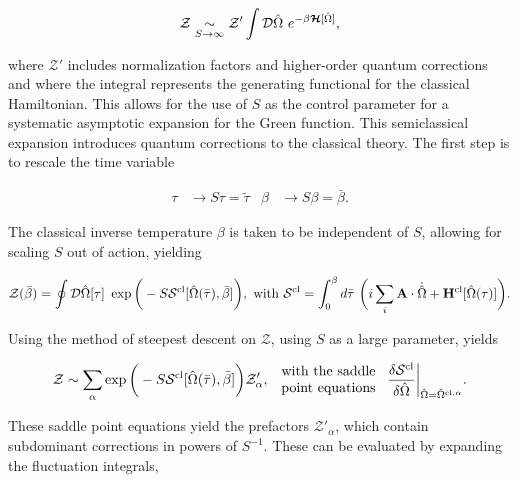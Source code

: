\begin{equation}
    \mathcal{Z} \underset{S \rightarrow \infty}{\sim} \mathcal{Z}' \int \mathcal{D}\hat{\Omega} \textnormal{ } e^{-\beta \bm{\mathcal{H}}[\hat{\Omega}]},
    \label{spin_wave_theoretic_wave_partition_func}
\end{equation}

where $\mathcal{Z}'$ includes normalization factors and higher-order quantum corrections and where the integral represents the generating functional for the classical Hamiltonian. This allows for the use of $S$ as the control parameter for a systematic asymptotic expansion for the Green function. This semiclassical expansion introduces quantum corrections to the classical theory. The first step is to rescale the time variable 

\begin{align}
    \tau &\rightarrow S\tau = \tilde{\tau} & \beta & \rightarrow S\beta = \bar{\beta}.
\end{align}

The classical inverse temperature $\beta$ is taken to be independent of $S$, allowing for scaling $S$ out of action, yielding 

\begin{equation}
    \mathcal{Z}(\bar{\beta}) = \oint \mathcal{D}\hat{\Omega}[\tau] \textnormal{ } \exp \bigg( - S \mathcal{S}^{\textnormal{cl}}[\hat{\Omega}(\bar{\tau}), \bar{\beta}]\bigg), \textnormal{ with } \mathcal{S}^{\textnormal{cl}} = \int_{0}^{\beta} d\bar{\tau} \textnormal{ } \bigg(i \sum_{i} {\bf A} \cdot \dot{\hat{\Omega}} + {\bf H}^{\textnormal{cl}}[\hat{\Omega}(\tau)]\bigg).
\end{equation}

Using the method of steepest descent on $\mathcal{Z}$, using $S$ as a large parameter, yields 

\begin{equation}
    \mathcal{Z} \sim \sum_{\alpha} \exp \bigg(-S \mathcal{S}^{\textnormal{cl}}[\hat{\Omega}(\bar{\tau}), \bar{\beta}]\bigg)\mathcal{Z}'_{\alpha}, \begin{array}{cc}
         \textnormal{ with the saddle } \\
         \textnormal{ point equations } 
    \end{array}\frac{\delta \mathcal{S}^{\textnormal{cl}}}{\delta \hat{\Omega}}\bigg|_{\hat{\Omega} = \hat{\Omega}^{\textnormal{cl}, \alpha}}. 
 \end{equation}

These saddle point equations yield the prefactors $\mathcal{Z}'_{\alpha}$, which contain subdominant corrections in powers of $S^{-1}$. These can be evaluated by expanding the fluctuation integrals, 

